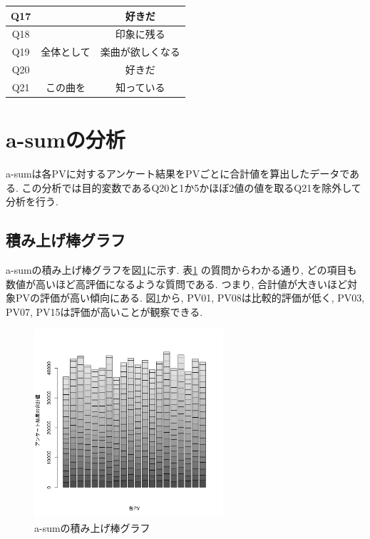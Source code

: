 \documentclass[12pt, a4j]{jsarticle}
\begin{document}
\begin{table}[htb]
\begin{minipage}[t]{.45\textwidth}
\begin{center}
{\begin{tabular}{|c|c|c|}
            Q17 &         & 好きだ        \\ \hline
            Q18 &         & 印象に残る \\ \cline{1-1} \cline{3-3}
            Q19 & 全体として & 楽曲が欲しくなる  \\ \cline{1-1} \cline{3-3}
            Q20 &         & 好きだ        \\ \hline
            Q21 & この曲を & 知っている \\ \hline
          \end{tabular}
          }
        \end{center}
        \label{table:question}   
      \end{minipage}
    \end{table}

  \section{a-sumの分析}
    a-sumは各PVに対するアンケート結果をPVごとに合計値を算出したデータである. 
    この分析では目的変数であるQ20と1か5かほぼ2値の値を取るQ21を除外して分析を行う.  
    
    \subsection{積み上げ棒グラフ}
      a-sumの積み上げ棒グラフを図\ref{fig:asum_bar}に示す. 表\ref{table:question}
      の質問からわかる通り, どの項目も数値が高いほど高評価になるような質問である. 
      つまり, 合計値が大きいほど対象PVの評価が高い傾向にある. 図\ref{fig:asum_bar}から, 
      PV01, PV08は比較的評価が低く, PV03, PV07, PV15は評価が高いことが観察できる. 

      \begin{figure}[htb]
        \centering
        \includegraphics[width=7cm]{../2nd/a-sum/bar.bmp}
        \caption{a-sumの積み上げ棒グラフ}
        \label{fig:asum_bar}
      \end{figure}
\end{document}
